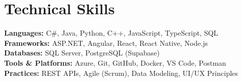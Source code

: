 \documentclass[letterpaper,10pt]{article}
\begin{document}
\section{Technical Skills}
\begin{itemize}[leftmargin=0.15in, label={}, itemsep=1pt]
\small{\item{
  \textbf{Languages:} C\#, Java, Python, C++, JavaScript, TypeScript, SQL \\
  \textbf{Frameworks:} ASP.NET, Angular, React, React Native, Node.js \\
  \textbf{Databases:} SQL Server, PostgreSQL (Supabase) \\
  \textbf{Tools \& Platforms:} Azure, Git, GitHub, Docker, VS Code, Postman \\
  \textbf{Practices:} REST APIs, Agile (Scrum), Data Modeling, UI/UX Principles
}}
\end{itemize}
\end{document}

